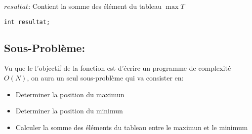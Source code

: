 \begingroup
$resultat$: Contient la somme des élément du tableau $\max{T}$
\endgroup
\begin{lstlisting}
int resultat;
\end{lstlisting}

\subsection{Sous-Problème:}
Vu que le l'objectif de la fonction est d'écrire un programme de complexité $O(N)$,
on aura un seul sous-problème qui va consister en:
\begin{itemize}
    \item Determiner la position du maximun
    \item Determiner la position du minimun
    \item Calculer la somme des éléments du tableau entre le maximun et le minimum
\end{itemize}